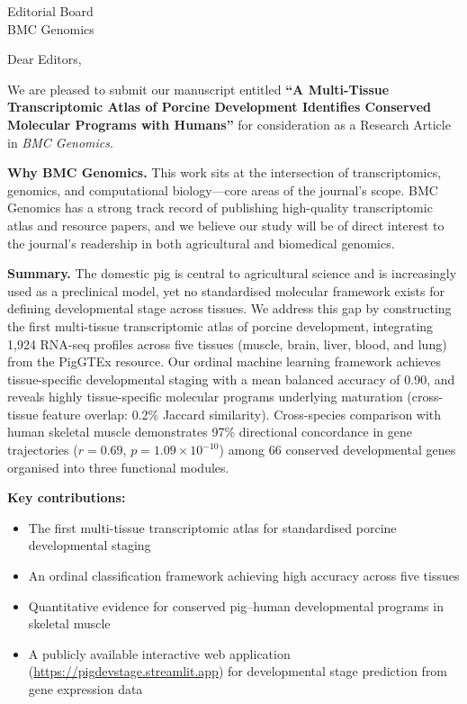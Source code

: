 \documentclass[11pt,a4paper]{letter}
\date{\today}
\begin{document}
\begin{letter}{Editorial Board\\BMC Genomics}

\opening{Dear Editors,}

We are pleased to submit our manuscript entitled \textbf{``A Multi-Tissue Transcriptomic Atlas of Porcine Development Identifies Conserved Molecular Programs with Humans''} for consideration as a Research Article in \textit{BMC Genomics}.

\textbf{Why BMC Genomics.} This work sits at the intersection of transcriptomics, genomics, and computational biology---core areas of the journal's scope. BMC Genomics has a strong track record of publishing high-quality transcriptomic atlas and resource papers, and we believe our study will be of direct interest to the journal's readership in both agricultural and biomedical genomics.

\textbf{Summary.} The domestic pig is central to agricultural science and is increasingly used as a preclinical model, yet no standardised molecular framework exists for defining developmental stage across tissues. We address this gap by constructing the first multi-tissue transcriptomic atlas of porcine development, integrating 1,924 RNA-seq profiles across five tissues (muscle, brain, liver, blood, and lung) from the PigGTEx resource. Our ordinal machine learning framework achieves tissue-specific developmental staging with a mean balanced accuracy of 0.90, and reveals highly tissue-specific molecular programs underlying maturation (cross-tissue feature overlap: 0.2\% Jaccard similarity). Cross-species comparison with human skeletal muscle demonstrates 97\% directional concordance in gene trajectories ($r = 0.69$, $p = 1.09 \times 10^{-10}$) among 66 conserved developmental genes organised into three functional modules.

\textbf{Key contributions:}
\begin{itemize}
\item The first multi-tissue transcriptomic atlas for standardised porcine developmental staging
\item An ordinal classification framework achieving high accuracy across five tissues
\item Quantitative evidence for conserved pig--human developmental programs in skeletal muscle
\item A publicly available interactive web application (\url{https://pigdevstage.streamlit.app}) for developmental stage prediction from gene expression data
\end{itemize}


\end{letter}
\end{document}
